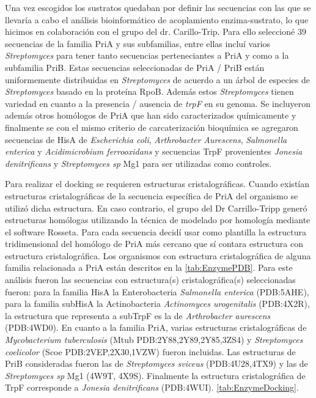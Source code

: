 \documentclass[12pt,twoside]{reedthesis}
\begin{document}
  Una vez escogidos los sustratos quedaban por definir las secuencias con
  las que se llevaría a cabo el análisis bioinformático de acoplamiento
  enzima-sustrato, lo que hicimos en colaboración con el grupo del dr.
  Carillo-Trip. Para ello seleccioné 39 secuencias de la familia PriA y
  sus subfamilias, entre ellas incluí varios \emph{Streptomyces} para
  tener tanto secuencias perteneciantes a PriA y como a la subfamilia
  PriB. Estas secuencias seleccionadas de PriA / PriB están uniformemente
  distribuidas en \emph{Streptomyces} de acuerdo a un árbol de especies de
  \emph{Streptomyces} basado en la proteína RpoB. Además estos
  \emph{Streptomyces} tienen variedad en cuanto a la presencia / ausencia
  de \emph{trpF} en su genoma. Se incluyeron además otros homólogos de
  PriA que han sido caracterizados químicamente y finalmente se con el
  mismo criterio de carcaterización bioquímica se agregaron secuencias de
  HisA de \emph{Escherichia coli}, \emph{Arthrobacter Aurescens},
  \emph{Salmonella enterica} y \emph{Acidimicrobium ferrooxidans} y
  secuencias TrpF provenientes \emph{Jonesia denitrificans} y
  \emph{Streptomyces sp } Mg1 para ser utilizadas como controles.
  
  Para realizar el docking se requieren estructuras cristalográficas.
  Cuando existían estructuras cristalográficas de la secuencia específica
  de PriA del organismo se utilizó dicha estructura. En caso contrario, el
  grupo del Dr Carrillo-Tripp generó estructuras homólogas utilizando la
  técnica de modelado por homología mediante el software Rosseta. Para
  cada secuencia decidí usar como plantilla la estructura tridimensional
  del homólogo de PriA más cercano que sí contara estructura con
  estructura cristalográfica. Los organismos con estructura
  cristalográfica de alguna familia relacionada a PriA están descritos en
  la \autoref{tab:EnzymePDB}. Para este análisis fueron las secuencias con
  estructura(s) cristalográfica(s) seleccionadas fueron: para la familia
  HisA la Enterobacteria \emph{Salmonella enterica} (PDB:5AHE), para la
  familia subHisA la Actinobacteria \emph{Actinomyces urogenitalis}
  (PDB:4X2R), la estructura que representa a subTrpF es la de
  \emph{Arthrobacter aurescens} (PDB:4WD0). En cuanto a la familia PriA,
  varias estructuras cristalográficas de \emph{Mycobacterium tuberculosis}
  (Mtub PDB:2Y88,2Y89,2Y85,3ZS4) y \emph{Streptomyces coelicolor} (Scoe
  PDB:2VEP,2X30,1VZW) fueron incluidas. Las estructuras de PriB
  consideradas fueron las de \emph{Streptomyces sviceus} (PDB:4U28,4TX9) y
  las de \emph{Streptomyces sp} Mg1 (4W9T, 4X9S). Finalmente la estructura
  cristalográfica de TrpF corresponde a \emph{Jonesia denitrificans}
  (PDB:4WUI). \autoref{tab:EnzymeDocking}.
  
\end{document}
